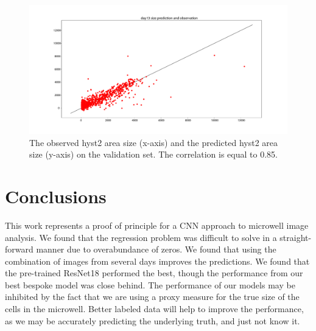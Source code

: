 \documentclass[10pt,twocolumn,letterpaper]{article}
\begin{document}
 \begin{figure}[b!]
\begin{center}
 \includegraphics[width=0.9\linewidth]{figures/regression/size_prediction_and_observation_scatter_plot.pdf}
\end{center}
   \caption{The observed hyst2 area size (x-axis) and the predicted hyst2 area size (y-axis) on the validation set.  The correlation is equal to 0.85.}
\label{regression_correlation}
\end{figure}





\section{Conclusions}



This work represents a proof of principle for a CNN approach to microwell image analysis.  We found that the regression problem was difficult to solve in a straight-forward manner due to overabundance of zeros.  We found that using the combination of images from several days improves the predictions.  We found that the pre-trained ResNet18 performed the best, though the performance from our best bespoke model was close behind.  The performance of our models may be inhibited by the fact that we are using a proxy measure for the true size of the cells in the microwell.  Better labeled data will help to improve the performance, as we may be accurately predicting the underlying truth, and just not know it.  
\end{document}
